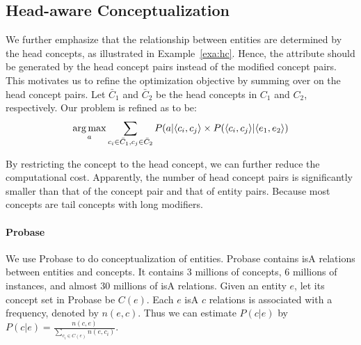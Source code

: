 \subsection{Head-aware Conceptualization}
We further emphasize that the relationship between entities are determined by the head concepts, as illustrated in Example~\ref{exa:hc}.
Hence, the attribute should be generated by the head concept pairs instead of the modified concept pairs.
This motivates us to refine the optimization objective by summing over on the head concept pairs.
Let $\bar{C}_1$ and $\bar{C}_2$ be the head concepts in  $C_1$ and $C_2$, respectively.
Our problem is refined as to be:
\begin{equation}
\label{eq:target_head}
\small
\argmax_a \sum_{c_i\in \bar{C}_1 , c_j \in \bar{C}_2 } P(a|\langle c_{i},c_{j} \rangle \times P(\langle c_{i},c_{j}\rangle|\langle e_{1},e_{2}\rangle)
\end{equation}

By restricting the concept to the head concept, we can further reduce the computational cost.
Apparently, the number of head concept pairs is significantly smaller than that of the concept pair and that of entity pairs.
Because most concepts are tail concepts with long modifiers.


\paragraph*{Probase}
We use Probase to do conceptualization of entities. 
Probase contains isA relations between entities and concepts. It contains 3 millions of concepts, 6 millions of instances, and almost 30 millions of isA relations.
Given an entity $e$, let its concept set in Probase be $C(e)$.
Each $e$ isA $c$ relations is associated with a frequency, denoted by $n(e, c)$.
Thus we can estimate  $P(c|e)$ by
$P(c|e)=\frac{n(c,e)}{\sum_{c_i\in C(e)}n(e, c_i)}$.


